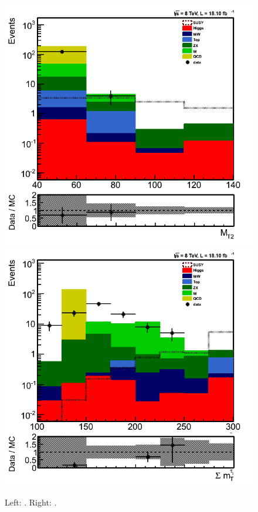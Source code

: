 \begin{figure}[htbp]
\centering
\includegraphics[angle=0,scale=0.35]{TauTauFigs/MT2_preSel.png}
\includegraphics[angle=0,scale=0.35]{TauTauFigs/SumMT_preSel.png} \\
\caption{Left: \mttwo. Right: \SumMT.}
\label{fig:comparison}
\end{figure}

